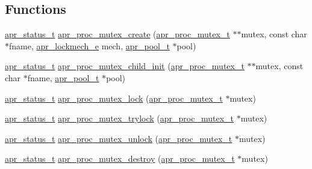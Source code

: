 \subsection*{Functions}
\begin{DoxyCompactItemize}
\item 
\hyperlink{group__apr__errno_gaf76ee4543247e9fb3f3546203e590a6c}{apr\+\_\+status\+\_\+t} \hyperlink{group__apr__proc__mutex_ga57a0ad8cc6209dcbc8cf7c4bdf4a2c22}{apr\+\_\+proc\+\_\+mutex\+\_\+create} (\hyperlink{group__apr__proc__mutex_ga0fae3a1ab686cd1f252c6062e4c97bd2}{apr\+\_\+proc\+\_\+mutex\+\_\+t} $\ast$$\ast$mutex, const char $\ast$fname, \hyperlink{group__apr__proc__mutex_ga75dd95a48a1e855a87b509b522746ed4}{apr\+\_\+lockmech\+\_\+e} mech, \hyperlink{group__apr__pools_gaf137f28edcf9a086cd6bc36c20d7cdfb}{apr\+\_\+pool\+\_\+t} $\ast$pool)
\item 
\hyperlink{group__apr__errno_gaf76ee4543247e9fb3f3546203e590a6c}{apr\+\_\+status\+\_\+t} \hyperlink{group__apr__proc__mutex_ga52c440b92eda07dc9c851a4e98f2ac83}{apr\+\_\+proc\+\_\+mutex\+\_\+child\+\_\+init} (\hyperlink{group__apr__proc__mutex_ga0fae3a1ab686cd1f252c6062e4c97bd2}{apr\+\_\+proc\+\_\+mutex\+\_\+t} $\ast$$\ast$mutex, const char $\ast$fname, \hyperlink{group__apr__pools_gaf137f28edcf9a086cd6bc36c20d7cdfb}{apr\+\_\+pool\+\_\+t} $\ast$pool)
\item 
\hyperlink{group__apr__errno_gaf76ee4543247e9fb3f3546203e590a6c}{apr\+\_\+status\+\_\+t} \hyperlink{group__apr__proc__mutex_ga9af7c9eabf4f99a5a33b41dc322af06f}{apr\+\_\+proc\+\_\+mutex\+\_\+lock} (\hyperlink{group__apr__proc__mutex_ga0fae3a1ab686cd1f252c6062e4c97bd2}{apr\+\_\+proc\+\_\+mutex\+\_\+t} $\ast$mutex)
\item 
\hyperlink{group__apr__errno_gaf76ee4543247e9fb3f3546203e590a6c}{apr\+\_\+status\+\_\+t} \hyperlink{group__apr__proc__mutex_ga7c41927ce5014374eb4fc66d410f9513}{apr\+\_\+proc\+\_\+mutex\+\_\+trylock} (\hyperlink{group__apr__proc__mutex_ga0fae3a1ab686cd1f252c6062e4c97bd2}{apr\+\_\+proc\+\_\+mutex\+\_\+t} $\ast$mutex)
\item 
\hyperlink{group__apr__errno_gaf76ee4543247e9fb3f3546203e590a6c}{apr\+\_\+status\+\_\+t} \hyperlink{group__apr__proc__mutex_ga4ecd9a73fbb0e6e6853e5d0769bbb183}{apr\+\_\+proc\+\_\+mutex\+\_\+unlock} (\hyperlink{group__apr__proc__mutex_ga0fae3a1ab686cd1f252c6062e4c97bd2}{apr\+\_\+proc\+\_\+mutex\+\_\+t} $\ast$mutex)
\item 
\hyperlink{group__apr__errno_gaf76ee4543247e9fb3f3546203e590a6c}{apr\+\_\+status\+\_\+t} \hyperlink{group__apr__proc__mutex_gaa692ccd799305e0166fb81f258870830}{apr\+\_\+proc\+\_\+mutex\+\_\+destroy} (\hyperlink{group__apr__proc__mutex_ga0fae3a1ab686cd1f252c6062e4c97bd2}{apr\+\_\+proc\+\_\+mutex\+\_\+t} $\ast$mutex)

\end{DoxyCompactItemize}
